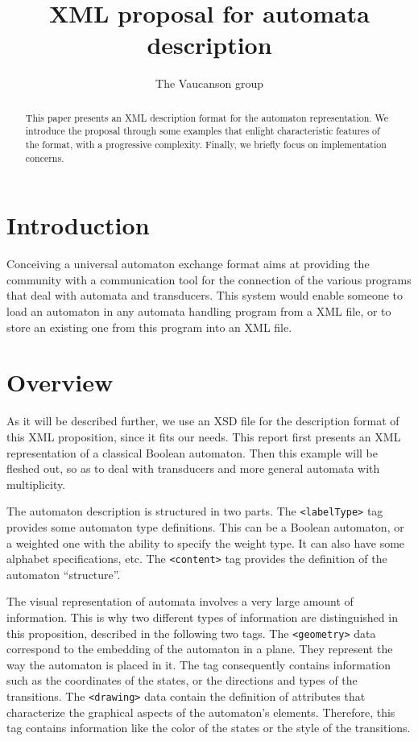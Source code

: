 \documentclass[a4paper]{article}
\newcommand{\Vauc}{{\sc Vaucanson}\xspace}
\newcommand{\xtag}[1]{\texttt{<#1>}}
\begin{document}
\title{XML proposal for automata description}

\author{The \Vauc group}

\maketitle{}

\begin{abstract}
This paper presents an XML description format for the automaton
representation. We introduce the proposal through some examples that
enlight characteristic features of the format, with a progressive
complexity. Finally, we briefly focus on implementation concerns.
\end{abstract}

\section*{Introduction}

Conceiving a universal automaton exchange format aims at providing the
community with a communication tool for the connection
of the various programs that deal with automata and transducers.  This
system would enable someone to load an automaton in any automata
handling program from a XML file, or to store an existing one from
this program into an XML file.

\section{Overview}

As it will be described further, we use an XSD file \cite{vaucanson.www.xsd}
for the description format of this XML proposition, since it fits our needs.
This report first presents an XML representation of a classical Boolean
automaton. Then this example will be fleshed out, so as to deal with transducers
and more general automata with multiplicity.

The automaton description is structured in two parts.  The
\xtag{labelType} tag provides some automaton type definitions. This can be a
Boolean automaton, or a weighted one with the ability to specify the
weight type.  It can also have some alphabet specifications, etc. The
\xtag{content} tag provides the definition of the automaton
``structure''.

The visual representation of automata involves a very large amount of
information. This is why two different types of information are
distinguished in this proposition, described in the following
two tags.  The \xtag{geometry} data correspond to the embedding
of the automaton in a plane. They represent the way the automaton is
placed in it. The tag consequently contains information such as the
coordinates of the states, or the directions and types of the
transitions. The \xtag{drawing} data contain the definition of
attributes that characterize the graphical aspects of the automaton's
elements. Therefore, this tag contains information like the color of
the states or the style of the transitions.
\end{document}
